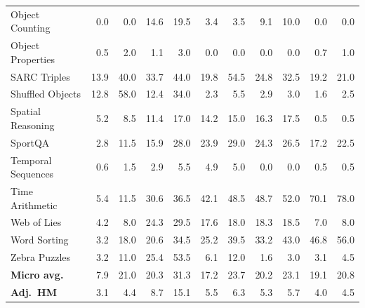 \begin{table}[!htbp]
\begin{tabular}{@{}l rr rr rr rr rr@{}}
    Object Counting & 0.0 & 0.0 & 14.6 & 19.5 & 3.4 & 3.5 & 9.1 & 10.0 & 0.0 & 0.0 \\
    Object Properties & 0.5 & 2.0 & 1.1 & 3.0 & 0.0 & 0.0 & 0.0 & 0.0 & 0.7 & 1.0 \\
    SARC Triples & 13.9 & 40.0 & 33.7 & 44.0 & 19.8 & 54.5 & 24.8 & 32.5 & 19.2 & 21.0 \\
    Shuffled Objects & 12.8 & 58.0 & 12.4 & 34.0 & 2.3 & 5.5 & 2.9 & 3.0 & 1.6 & 2.5 \\
    Spatial Reasoning & 5.2 & 8.5 & 11.4 & 17.0 & 14.2 & 15.0 & 16.3 & 17.5 & 0.5 & 0.5 \\
    SportQA & 2.8 & 11.5 & 15.9 & 28.0 & 23.9 & 29.0 & 24.3 & 26.5 & 17.2 & 22.5 \\
    Temporal Sequences & 0.6 & 1.5 & 2.9 & 5.5 & 4.9 & 5.0 & 0.0 & 0.0 & 0.5 & 0.5 \\
    Time Arithmetic & 5.4 & 11.5 & 30.6 & 36.5 & 42.1 & 48.5 & 48.7 & 52.0 & 70.1 & 78.0 \\
    Web of Lies & 4.2 & 8.0 & 24.3 & 29.5 & 17.6 & 18.0 & 18.3 & 18.5 & 7.0 & 8.0 \\
    Word Sorting & 3.2 & 18.0 & 20.6 & 34.5 & 25.2 & 39.5 & 33.2 & 43.0 & 46.8 & 56.0 \\
    Zebra Puzzles & 3.2 & 11.0 & 25.4 & 53.5 & 6.1 & 12.0 & 1.6 & 3.0 & 3.1 & 4.5 \\
    \midrule
    \textbf{Micro avg.} & 7.9 & 21.0 & 20.3 & 31.3 & 17.2 & 23.7 & 20.2 & 23.1 & 19.1 & 20.8 \\
    \textbf{Adj.\ HM}   & 3.1 & 4.4 & 8.7 & 15.1 & 5.5 & 6.3 & 5.3 & 5.7 & 4.0 & 4.5 \\
    \bottomrule
  \end{tabular}
\end{table}
